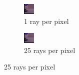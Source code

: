 \begin{figure}[h]
\centering
\begin{subfigure}[b]{0.4\textwidth}
	\includegraphics[width=\textwidth]{./images/renders/no-aa.png}
	\caption{1 ray per pixel}
\end{subfigure}
\begin{subfigure}[b]{0.4\textwidth}
	\includegraphics[width=\textwidth]{./images/renders/aa.png}
	\caption{25 rays per pixel}
\end{subfigure}
\end{figure}
